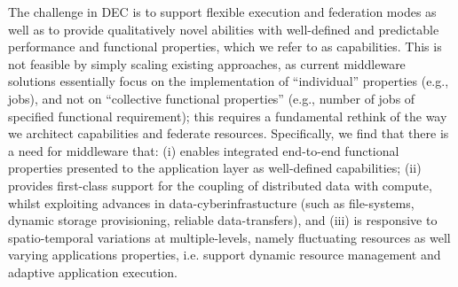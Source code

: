\documentclass[11pt,final]{article}
\newcommand{\msnote}[1]{ {\textcolor{green} { ***Mark: #1 }}}
\newcommand{\msnote}[1]{}
\begin{document}
{%


 The
challenge in DEC is to support flexible execution and federation modes
as well as to provide qualitatively novel abilities with well-defined
and predictable performance and functional properties, which we refer
to as capabilities.  This is not feasible by simply scaling existing
approaches, as current middleware solutions essentially focus on the
implementation of ``individual'' properties (e.g., jobs), and not on
``collective functional properties'' (e.g., number of jobs of
specified functional requirement); this requires a fundamental rethink
of the way we architect capabilities and federate resources.
Specifically, we find that there is a need for middleware that: (i)
enables integrated end-to-end functional properties presented to the
application layer as well-defined capabilities; (ii) provides
first-class support for the coupling of distributed data with compute,
whilst exploiting advances in data-cyberinfrastucture (such as
file-systems, dynamic storage provisioning, reliable data-transfers),
and (iii) is responsive to spatio-temporal variations at
multiple-levels, namely fluctuating resources as well varying
applications properties, i.e. support dynamic resource management and
adaptive application execution.




}
\end{document}
